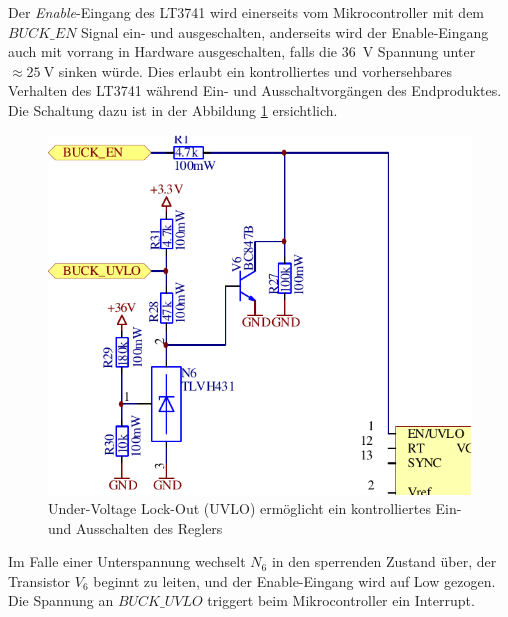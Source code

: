 Der \emph{Enable}-Eingang des LT3741 wird einerseits vom Mikrocontroller mit dem
$BUCK\_EN$  Signal ein- und ausgeschalten, anderseits  wird  der  Enable-Eingang
auch mit vorrang in Hardware ausgeschalten, falls  die  \SI{36}{\volt}  Spannung
unter $\approx  \SI{25}{\volt}$  sinken w\"urde. Dies erlaubt ein kontrolliertes
und vorhersehbares Verhalten  des LT3741 w\"ahrend Ein- und Ausschaltvorg\"angen
des Endproduktes. Die Schaltung dazu ist in der Abbildung \ref{fig:circuit:uvlo}
ersichtlich.

\begin{figure}[th!]
    \center
    \includegraphics[width=.6\textwidth]{images/circuit/uvlo.pdf}
    \caption{Under-Voltage Lock-Out (UVLO) erm\"oglicht ein kontrolliertes Ein- und Ausschalten des Reglers}
    \label{fig:circuit:uvlo}
\end{figure}

Im Falle einer Unterspannung  wechselt  $N_6$  in den sperrenden Zustand \"uber,
der  Transistor $V_6$ beginnt zu leiten, und der  Enable-Eingang  wird  auf  Low
gezogen.  Die  Spannung  an  $BUCK\_UVLO$  triggert  beim  Mikrocontroller   ein
Interrupt.
